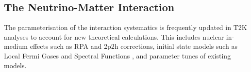 
\subsection{The Neutrino-Matter Interaction}
\label{subsec:syst_xsec}
The parameterisation of the interaction systematics is frequently updated in T2K analyses to account for new theoretical calculations. This includes nuclear in-medium effects such as RPA and 2p2h corrections\cite{nieves1,nieves2}, initial state models such as Local Fermi Gases \cite{lfg} and Spectral Functions \cite{benhar}, and parameter tunes of existing models\cite{ccqe_tuning}.

